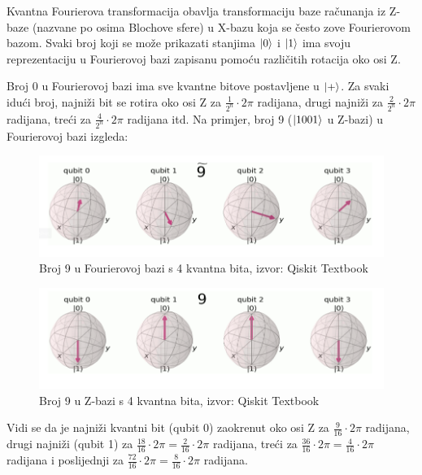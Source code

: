Kvantna Fourierova transformacija obavlja transformaciju baze računanja iz Z-baze (nazvane po osima Blochove sfere) u X-bazu koja se često zove Fourierovom bazom. Svaki broj koji se može prikazati stanjima $\ket{0}$ i $\ket{1}$ ima svoju reprezentaciju u Fourierovoj bazi zapisanu pomoću različitih rotacija oko osi Z. 

Broj 0 u Fourierovoj bazi ima sve kvantne bitove postavljene u $\ket{+}$. Za svaki idući broj, najniži bit se rotira oko osi Z za $\frac{1}{2^n}\cdot 2\pi$ radijana, drugi najniži za $\frac{2}{2^n}\cdot 2\pi$ radijana, treći za $\frac{4}{2^n}\cdot 2\pi$ radijana itd. Na primjer, broj 9 ($\ket{1001}$ u Z-bazi) u Fourierovoj bazi izgleda:
\begin{figure}[H]
\centering
\includegraphics[scale=0.65]{img/Fourier9.png}
\caption{Broj 9 u Fourierovoj bazi s 4 kvantna bita, izvor: Qiskit Textbook\citep{Qiskit-Textbook}}
\end{figure}

\begin{figure}[H]
\centering
\includegraphics[scale=0.65]{img/Zbase9.png}
\caption{Broj 9 u Z-bazi s 4 kvantna bita, izvor: Qiskit Textbook\citep{Qiskit-Textbook}}
\end{figure}

Vidi se da je najniži kvantni bit (qubit 0) zaokrenut oko osi Z za $\frac{9}{16}\cdot 2\pi$ radijana, drugi najniži (qubit 1) za $\frac{18}{16}\cdot 2\pi = \frac{2}{16}\cdot 2\pi$ radijana, treći za $\frac{36}{16}\cdot 2\pi = \frac{4}{16}\cdot 2\pi$ radijana i poslijednji za $\frac{72}{16}\cdot 2\pi = \frac{8}{16}\cdot 2\pi$ radijana.


